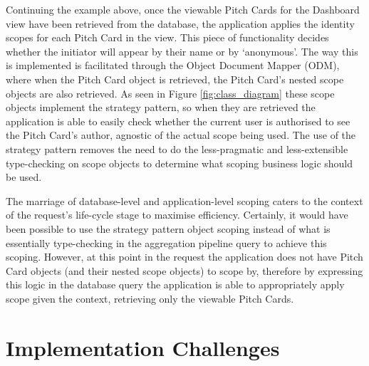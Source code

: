 Continuing the example above, once the viewable Pitch Cards for the Dashboard view have been retrieved from the database, the application applies the identity scopes for each Pitch Card in the view. This piece of functionality decides whether the initiator will appear by their name or by `anonymous'. The way this is implemented is facilitated through the Object Document Mapper (ODM), where when the Pitch Card object is retrieved, the Pitch Card's nested scope objects are also retrieved. As seen in Figure \ref{fig:class_diagram} these scope objects implement the strategy pattern, so when they are retrieved the application is able to easily check whether the current user is authorised to see the Pitch Card's author, agnostic of the actual scope being used. The use of the strategy pattern removes the need to do the less-pragmatic and less-extensible type-checking on scope objects to determine what scoping business logic should be used.
\par
The marriage of database-level and application-level scoping caters to the context of the request's life-cycle stage to maximise efficiency. Certainly, it would have been possible to use the strategy pattern object scoping instead of what is essentially type-checking in the aggregation pipeline query to achieve this scoping. However, at this point in the request the application does not have Pitch Card objects (and their nested scope objects) to scope by, therefore by expressing this logic in the database query the application is able to appropriately apply scope given the context, retrieving only the viewable Pitch Cards.

\section{Implementation Challenges}

